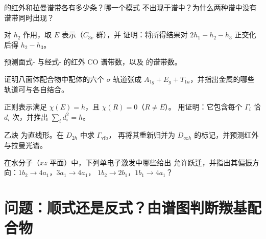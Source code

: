 \begin{exercise}[$\star\star$]\label{exo:b3:group-theory-applied:6}
 的红外和拉曼谱带各有多少条？哪一个模式
不出现于谱中？为什么两种谱中没有谱带同时出现？
\end{exercise}

\begin{exercise}[$\star\star$]\label{exo:b3:group-theory-applied:7}
对 $h_2$ 作用，取 $E$ 表示（$C_{3v}$ 群），并
证明：将所得结果对 $2h_1 - h_2 - h_3$ 正交化后得 $h_2 - h_3$。
\end{exercise}

\begin{exercise}[$\star\star$]\label{exo:b3:group-theory-applied:8}
预测面式- 与经式- 的红外 CO 谱带数，以及
 的谱带数。
\end{exercise}

\begin{exercise}[$\star\star$]\label{exo:b3:group-theory-applied:9}
证明八面体配合物中配体的六个 $\sigma$ 轨道张成
$A_{1g} + E_g + T_{1u}$，并指出金属的哪些轨道可与各自结合。
\end{exercise}

\begin{exercise}[$\star\star\star$]\label{exo:b3:group-theory-applied:10}
正则表示满足 $\chi(E) = h$，且 $\chi(R) = 0$（$R \ne E$）。
用证明：它包含每个
$\Gamma_i$ 恰 $d_i$ 次，并推出 $\sum_id_i^2 = h$。
\end{exercise}

\begin{exercise}[$\star\star\star$]\label{exo:b3:group-theory-applied:11}
乙炔  为直线形。在 $D_{2h}$ 中求 $\Gamma_{\mathrm{vib}}$，
再将其重新归并为 $D_{\infty h}$ 的标记，并预测红外与拉曼光谱。
\end{exercise}

\begin{exercise}[$\star\star\star$]\label{exo:b3:group-theory-applied:12}
在水分子（$xz$ 平面）中，下列单电子激发中哪些给出
允许跃迁，并指出其偏振方向：$1b_2 \to 4a_1$，$3a_1 \to 4a_1$，
$1b_2 \to 2b_1$，$1b_1 \to 4a_1$？
\end{exercise}

\section{问题：顺式还是反式？由谱图判断羰基配合物}

